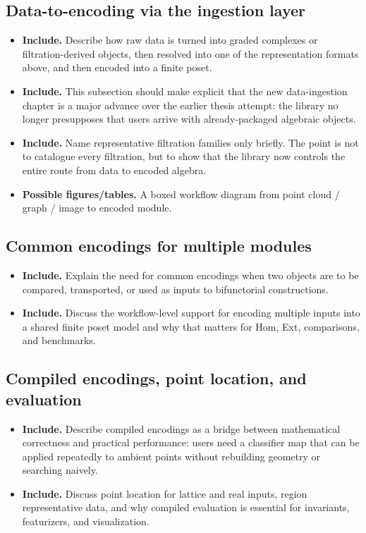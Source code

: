 \documentclass[11pt]{article}
\newenvironment{plan}{\begin{itemize}[leftmargin=1.6em,itemsep=0.35em,topsep=0.25em]}{\end{itemize}}
\newcommand{\includeitems}[1]{\item \textbf{Include.} #1}
\newcommand{\figures}[1]{\item \textbf{Possible figures/tables.} #1}
\begin{document}
\subsection{Data-to-encoding via the ingestion layer}

\begin{plan}
    \includeitems{Describe how raw data is turned into graded complexes or filtration-derived objects, then resolved into one of the representation formats above, and then encoded into a finite poset.}
    \includeitems{This subsection should make explicit that the new data-ingestion chapter is a major advance over the earlier thesis attempt: the library no longer presupposes that users arrive with already-packaged algebraic objects.}
    \includeitems{Name representative filtration families only briefly. The point is not to catalogue every filtration, but to show that the library now controls the entire route from data to encoded algebra.}
    \figures{A boxed workflow diagram from point cloud / graph / image to encoded module.}
\end{plan}

\subsection{Common encodings for multiple modules}

\begin{plan}
    \includeitems{Explain the need for common encodings when two objects are to be compared, transported, or used as inputs to bifunctorial constructions.}
    \includeitems{Discuss the workflow-level support for encoding multiple inputs into a shared finite poset model and why that matters for Hom, Ext, comparisons, and benchmarks.}
\end{plan}

\subsection{Compiled encodings, point location, and evaluation}

\begin{plan}
    \includeitems{Describe compiled encodings as a bridge between mathematical correctness and practical performance: users need a classifier map that can be applied repeatedly to ambient points without rebuilding geometry or searching naively.}
    \includeitems{Discuss point location for lattice and real inputs, region representative data, and why compiled evaluation is essential for invariants, featurizers, and visualization.}
\end{plan}
\end{document}
